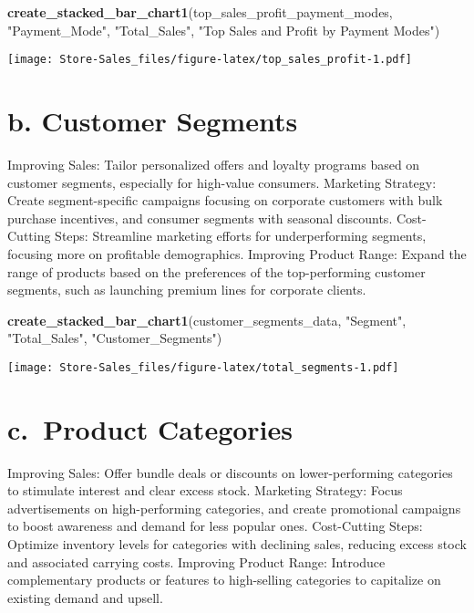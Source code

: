 \documentclass[
]{article}
\newenvironment{Shaded}{\begin{snugshade}}{\end{snugshade}}
\newcommand{\FunctionTok}[1]{\textcolor[rgb]{0.13,0.29,0.53}{\textbf{#1}}}
\newcommand{\NormalTok}[1]{#1}
\newcommand{\StringTok}[1]{\textcolor[rgb]{0.31,0.60,0.02}{#1}}
\begin{document}
\begin{Shaded}
\begin{Highlighting}[]
\FunctionTok{create\_stacked\_bar\_chart1}\NormalTok{(top\_sales\_profit\_payment\_modes, }\StringTok{"Payment\_Mode"}\NormalTok{, }\StringTok{"Total\_Sales"}\NormalTok{, }\StringTok{"Top Sales and Profit by Payment Modes"}\NormalTok{)}
\end{Highlighting}
\end{Shaded}

\texttt{[image: Store-Sales\_files/figure-latex/top\_sales\_profit-1.pdf]}

\hypertarget{b.-customer-segments}{%
\section{b. Customer Segments}\label{b.-customer-segments}}

Improving Sales: Tailor personalized offers and loyalty programs based
on customer segments, especially for high-value consumers. Marketing
Strategy: Create segment-specific campaigns focusing on corporate
customers with bulk purchase incentives, and consumer segments with
seasonal discounts. Cost-Cutting Steps: Streamline marketing efforts for
underperforming segments, focusing more on profitable demographics.
Improving Product Range: Expand the range of products based on the
preferences of the top-performing customer segments, such as launching
premium lines for corporate clients.

\begin{Shaded}
\begin{Highlighting}[]
\FunctionTok{create\_stacked\_bar\_chart1}\NormalTok{(customer\_segments\_data, }\StringTok{"Segment"}\NormalTok{, }\StringTok{"Total\_Sales"}\NormalTok{, }\StringTok{"Customer\_Segments"}\NormalTok{)}
\end{Highlighting}
\end{Shaded}

\texttt{[image: Store-Sales\_files/figure-latex/total\_segments-1.pdf]}

\hypertarget{c.-product-categories}{%
\section{c.~Product Categories}\label{c.-product-categories}}

Improving Sales: Offer bundle deals or discounts on lower-performing
categories to stimulate interest and clear excess stock. Marketing
Strategy: Focus advertisements on high-performing categories, and create
promotional campaigns to boost awareness and demand for less popular
ones. Cost-Cutting Steps: Optimize inventory levels for categories with
declining sales, reducing excess stock and associated carrying costs.
Improving Product Range: Introduce complementary products or features to
high-selling categories to capitalize on existing demand and upsell.
\end{document}
